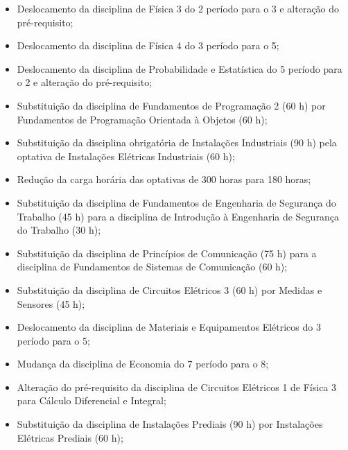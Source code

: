 \begin{itemize}
	\item Deslocamento da disciplina de Física 3 do 2\textordmasculine{} período para o 3\textordmasculine{}  e alteração do pré-requisito;
	
	\item Deslocamento da disciplina de Física 4 do 3\textordmasculine{} período para o 5\textordmasculine{};
	
	\item Deslocamento da disciplina de Probabilidade e Estatística do 5\textordmasculine{} período para o 2\textordmasculine{} e alteração do pré-requisito;
	
	\item Substituição da disciplina de Fundamentos de Programação 2 (60 h) por Fundamentos de Programação Orientada à Objetos (60 h);
	
	\item Substituição da disciplina obrigatória de Instalações Industriais (90 h) pela optativa de Instalações Elétricas Industriais (60 h);
	
	\item Redução da carga horária das optativas de 300 horas para 180 horas;
	
	\item Substituição da disciplina de Fundamentos de Engenharia de Segurança do Trabalho (45 h) para a disciplina de Introdução à Engenharia de Segurança do Trabalho (30 h);
	
	\item Substituição da disciplina de Princípios de Comunicação (75 h) para a disciplina de Fundamentos de Sistemas de Comunicação (60 h);
	
	\item Substituição da disciplina de Circuitos Elétricos 3 (60 h) por Medidas e Sensores (45 h);
	
	\item Deslocamento da disciplina de Materiais e Equipamentos Elétricos do 3\textordmasculine{} período para o 5\textordmasculine{};
	
	\item Mudança da disciplina de Economia do 7\textordmasculine{} período para o 8\textordmasculine{};
	
	\item Alteração do pré-requisito da disciplina de Circuitos Elétricos 1 de Física 3 para Cálculo Diferencial e Integral;
	
	\item Substituição da disciplina de Instalações Prediais (90 h) por Instalações Elétricas Prediais (60 h);
	

\end{itemize}
